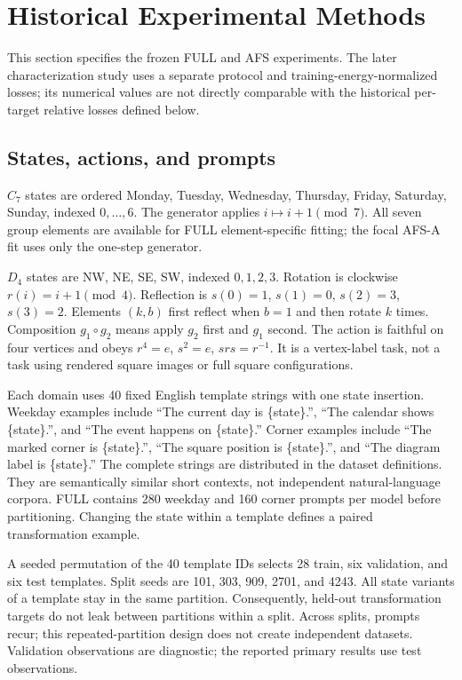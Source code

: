 \section{Historical Experimental Methods}
\label{app:methods}
This section specifies the frozen FULL and AFS experiments. The later characterization study uses a separate protocol and training-energy-normalized losses; its numerical values are not directly comparable with the historical per-target relative losses defined below.
\subsection{States, actions, and prompts}
$C_7$ states are ordered Monday, Tuesday, Wednesday, Thursday, Friday, Saturday, Sunday, indexed $0,\ldots,6$. The generator applies $i\mapsto i+1\pmod7$. All seven group elements are available for FULL element-specific fitting; the focal AFS-A fit uses only the one-step generator.

$D_4$ states are NW, NE, SE, SW, indexed $0,1,2,3$. Rotation is clockwise $r(i)=i+1\pmod4$. Reflection is $s(0)=1$, $s(1)=0$, $s(2)=3$, $s(3)=2$. Elements $(k,b)$ first reflect when $b=1$ and then rotate $k$ times. Composition $g_1\circ g_2$ means apply $g_2$ first and $g_1$ second. The action is faithful on four vertices and obeys $r^4=e$, $s^2=e$, $srs=r^{-1}$. It is a vertex-label task, not a task using rendered square images or full square configurations.

Each domain uses 40 fixed English template strings with one state insertion. Weekday examples include ``The current day is \{state\}.'', ``The calendar shows \{state\}.'', and ``The event happens on \{state\}.'' Corner examples include ``The marked corner is \{state\}.'', ``The square position is \{state\}.'', and ``The diagram label is \{state\}.'' The complete strings are distributed in the dataset definitions. They are semantically similar short contexts, not independent natural-language corpora. FULL contains 280 weekday and 160 corner prompts per model before partitioning. Changing the state within a template defines a paired transformation example.

A seeded permutation of the 40 template IDs selects 28 train, six validation, and six test templates. Split seeds are 101, 303, 909, 2701, and 4243. All state variants of a template stay in the same partition. Consequently, held-out transformation targets do not leak between partitions within a split. Across splits, prompts recur; this repeated-partition design does not create independent datasets. Validation observations are diagnostic; the reported primary results use test observations.

